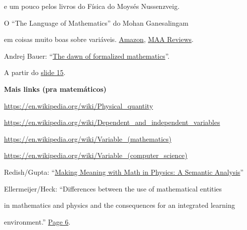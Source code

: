 \documentclass[oneside,12pt]{article}
\begin{document}
\ssk

e um pouco pelos livros do Física do Moysés Nussenzveig.

\bsk

O ``The Language of Mathematics'' do Mohan Ganesalingam 

em coisas muito boas sobre variáveis.
\href{https://www.amazon.com/Language-Mathematics-Linguistic-Philosophical-Investigation/dp/364237011X}{Amazon},
\href{https://www.maa.org/press/maa-reviews/the-language-of-mathematics}{MAA
  Reviews}.


\bsk

Andrej Bauer: ``\href{http://math.andrej.com/2021/06/24/the-dawn-of-formalized-mathematics/}{The
  dawn of formalized mathematics}''.

A partir do
\href{http://math.andrej.com/asset/data/the-dawn-of-formalized-mathematics.pdf\#page=15}{slide
  15}.


\newpage

{\bf Mais links (pra matemáticos)}

\bsk

{\footnotesize

\url{https://en.wikipedia.org/wiki/Physical_quantity}

\url{https://en.wikipedia.org/wiki/Dependent_and_independent_variables}

\url{https://en.wikipedia.org/wiki/Variable_(mathematics)}

\url{https://en.wikipedia.org/wiki/Variable_(computer_science)}

\msk

%
Redish/Gupta: ``\href{https://arxiv.org/pdf/1002.0472.pdf}{Making
  Meaning with Math in Physics: A Semantic Analysis}''

\msk

Ellermeijer/Heck: ``Differences between the use of mathematical entities

in mathematics and physics and the consequences for an integrated learning

environment.''
\href{https://staff.fnwi.uva.nl/a.j.p.heck/research/art/girep2001.pdf\#page=6}{Page
  6}.

}


\newpage

\end{document}
